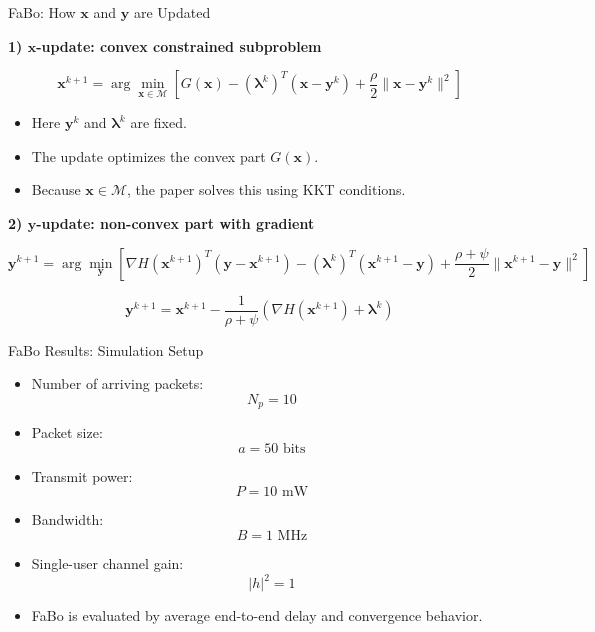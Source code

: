 \documentclass{beamer}
\begin{document}
\begin{frame}{FaBo: How $\mathbf{x}$ and $\mathbf{y}$ are Updated}
\small

\textbf{1) $\mathbf{x}$-update: convex constrained subproblem}

\[
\mathbf{x}^{k+1}
=
\arg\min_{\mathbf{x}\in\mathcal{M}}
\left[
G(\mathbf{x})
-
(\boldsymbol{\lambda}^{k})^T(\mathbf{x}-\mathbf{y}^{k})
+
\frac{\rho}{2}
\|\mathbf{x}-\mathbf{y}^{k}\|^2
\right]
\]

\begin{itemize}
    \item Here $\mathbf{y}^{k}$ and $\boldsymbol{\lambda}^{k}$ are fixed.
    \item The update optimizes the convex part $G(\mathbf{x})$.
    \item Because $\mathbf{x}\in\mathcal{M}$, the paper solves this using KKT conditions.
\end{itemize}

\vspace{0.1cm}

\textbf{2) $\mathbf{y}$-update: non-convex part with gradient}

\[
\mathbf{y}^{k+1}
=
\arg\min_{\mathbf{y}}
\left[
\nabla H(\mathbf{x}^{k+1})^T(\mathbf{y}-\mathbf{x}^{k+1})
-
(\boldsymbol{\lambda}^{k})^T(\mathbf{x}^{k+1}-\mathbf{y})
+
\frac{\rho+\psi}{2}
\|\mathbf{x}^{k+1}-\mathbf{y}\|^2
\right]
\]

\[
\boxed{
\mathbf{y}^{k+1}
=
\mathbf{x}^{k+1}
-
\frac{1}{\rho+\psi}
\left(
\nabla H(\mathbf{x}^{k+1})
+
\boldsymbol{\lambda}^{k}
\right)
}
\]

\end{frame}

\begin{frame}{FaBo Results: Simulation Setup}
\small

\begin{itemize}
    \item Number of arriving packets:
    \[
    N_p = 10
    \]

    \item Packet size:
    \[
    a = 50 \text{ bits}
    \]

    \item Transmit power:
    \[
    P = 10 \text{ mW}
    \]

    \item Bandwidth:
    \[
    B = 1 \text{ MHz}
    \]

    \item Single-user channel gain:
    \[
    |h|^2 = 1
    \]

    \item FaBo is evaluated by average end-to-end delay and convergence behavior.
\end{itemize}

\end{frame}
\end{document}
